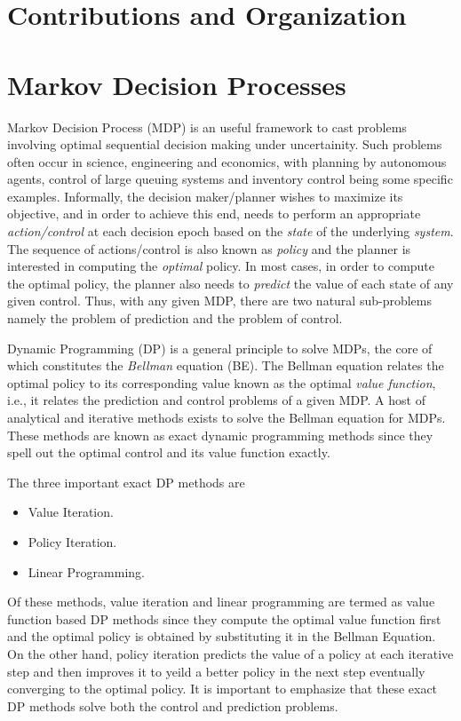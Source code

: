 \section{Contributions and Organization}
\section{Markov Decision Processes}
Markov Decision Process (MDP) is an useful framework to cast problems involving optimal sequential decision making under uncertainity. Such problems often occur in science, engineering and economics, with planning by autonomous agents, control of large queuing systems and inventory control being some specific examples. Informally, the decision maker/planner wishes to maximize its objective, and in order to achieve this end, needs to perform an appropriate \emph{action/control} at each decision epoch based on the \emph{state} of the underlying \emph{system}. 
The sequence of actions/control is also known as \emph{policy} and the planner is interested in computing the \emph{optimal} policy. In most cases, in order to compute the optimal policy, the planner also needs to \emph{predict} the value of each state of any given control. Thus, with any given MDP, there are two natural sub-problems namely the problem of prediction and the problem of control.\par
Dynamic Programming (DP) is a general principle to solve MDPs, the core of which constitutes the \emph{Bellman} equation (BE). The Bellman equation relates the optimal policy to its corresponding value known as the optimal \emph{value function}, i.e., it relates the prediction and control problems of a given MDP. A host of analytical and iterative methods exists to solve the Bellman equation for MDPs. These methods are known as exact dynamic programming methods since they spell out the optimal control and its value function exactly.\par
The three important exact DP methods are 
\begin{itemize}
\item Value Iteration.
\item Policy Iteration.
\item Linear Programming.
\end{itemize}
Of these methods, value iteration and linear programming are termed as value function based DP methods since they compute the optimal value function first and the optimal policy is obtained by substituting it in the Bellman Equation. On the other hand, policy iteration predicts the value of a policy at each iterative step and then improves it to yeild a better policy in the next step eventually converging to the optimal policy. It is important to emphasize that these exact DP methods solve both the control and prediction problems.\par
